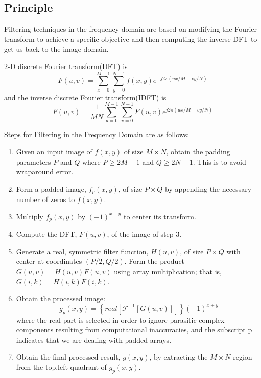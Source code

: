 \documentclass[11pt,a4paper]{article}
\begin{document}
\subsection{Principle}

Filtering techniques in the frequency domain are based on modifying the
Fourier transform to achieve a specific objective and then computing the inverse
DFT to get us back to the image domain.

2-D discrete Fourier transform(DFT) is 
\begin{equation}
	F(u,v)=\sum_{x=0}^{M-1}\sum_{y=0}^{N-1}f(x,y)e^{-j2\pi(ux/M+vy/N)}
\end{equation}
and the inverse discrete Fourier transform(IDFT) is
\begin{equation}
	F(u,v)=\frac{1}{MN}\sum_{u=0}^{M-1}\sum_{v=0}^{N-1}F(u,v)e^{j2\pi(ux/M+vy/N)}
\end{equation}

Steps for Filtering in the Frequency Domain are as follows:
\begin{enumerate}
	\item Given an input image of $f(x,y)$ of size $M\times N$, obtain the padding
	parameters $P$ and $Q$ where $P\geq 2M-1$ and $Q\geq 2N-1$. This is to avoid wraparound error.
	\item Form a padded image, $f_p(x,y)$, of size $P\times Q$ by appending the 
	necessary number of zeros to $f(x,y)$.
	\item Multiply $f_p(x,y)$ by $(-1)^{x+y}$ to center its transform.
	\item Compute the DFT, $F(u,v)$, of the image of step 3.
	\item Generate a real, symmetric filter function, $H(u,v)$, of size $P\times Q$
	with center at coordinates $(P/2,Q/2)$. Form the product $G(u,v)=H(u,v)F(u,v)$
	using array multiplication; that is, $G(i,k)=H(i,k)F(i,k)$.
	\item Obtain the processed image:
	\begin{equation}
		g_p(x,y)=\left\{real\left[\mathcal{F}^{-1}\left[G(u,v)\right]\right]\right\}(-1)^{x+y}
	\end{equation}
	where the real part is selected in order to ignore parasitic complex components
	resulting from computational inaccuracies, and the subscript p indicates
	that we are dealing with padded arrays.
	\item Obtain the final processed result, $g(x,y)$, by extracting the $M\times N$ region
	from the top,left quadrant of $g_p(x,y)$.
\end{enumerate}
\end{document}
